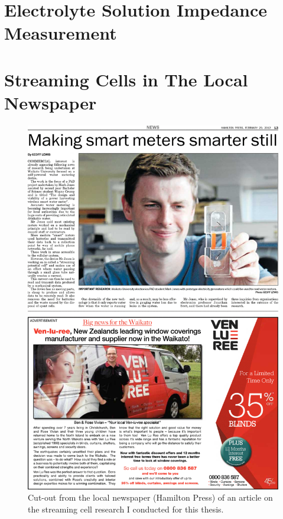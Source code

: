    \chapter{Electrolyte Solution Impedance Measurement}
     

   \chapter{Streaming Cells in The Local Newspaper}
   \begin{figure}
       \centering
       \includegraphics[width=\textwidth]{content/appendices/Article}
       \caption{Cut-out from the local newspaper (Hamilton Press) of an article on the streaming cell research I conducted for this thesis.}
   \end{figure}






